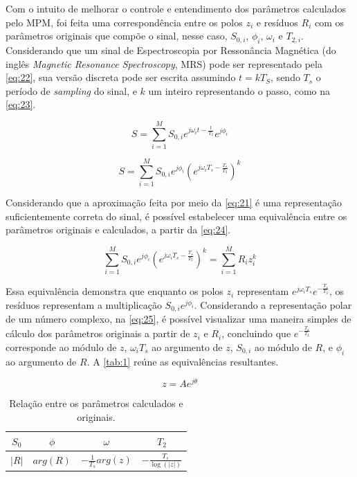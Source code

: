 \documentclass[12pt]{article}
\begin{document}
Com o intuito de melhorar o controle e entendimento dos parâmetros calculados pelo MPM, foi feita uma correspondência entre os polos $z_i$ e resíduos $R_i$ com
os parâmetros originais que compõe o sinal, nesse caso, $S_{0, i}$, $\phi_i$, $\omega_i$ e $T_{2, i}$. Considerando que um sinal de Espectroscopia por Ressonância Magnética 
(do inglês \textit{Magnetic Resonance Spectroscopy}, MRS) pode ser representado pela \autoref{eq:22}, sua versão discreta pode ser escrita assumindo $t = kT_S$, sendo $T_s$ 
o período de \textit{sampling} do sinal, e $k$ um inteiro representando o passo, como na \autoref{eq:23}.

\begin{equation} \label{eq:22}
    S = \sum_{i=1}^{M} S_{0, i} e^{j\omega_i t -\frac{t}{T_2}}e^{j \phi_i} 
\end{equation}

\begin{equation} \label{eq:23}
    S = \sum_{i=1}^{M} S_{0, i} e^{j \phi_i}  (e^{j\omega_i T_s -\frac{T_s}{T_2}})^k 
\end{equation}

Considerando que a aproximação feita por meio da \autoref{eq:21} é uma representação suficientemente correta do sinal, é possível estabelecer uma equivalência 
entre os parâmetros originais e calculados, a partir da \autoref{eq:24}.

\begin{equation} \label{eq:24}
    \sum_{i=1}^{M} S_{0, i} e^{j \phi_i}  (e^{j\omega_i T_s -\frac{T_s}{T_2}})^k  = \sum_{i = 1}^{M} R_i z_i^{k}
\end{equation}

Essa equivalência demonstra que enquanto os polos $z_i$ representam $e^{j\omega_i T_s} e^{-\frac{T_s}{T_2}}$, os resíduos representam a multiplicação 
$S_{0, i} e^{j \phi_i}$. Considerando a representação polar de um número complexo, na \autoref{eq:25}, é possível visualizar uma maneira simples de 
cálculo dos parâmetros originais a partir de $z_i$ e $R_i$, concluindo que $e^{-\frac{T_s}{T_2}}$ corresponde ao módulo de $z$, $\omega_i T_s$ ao argumento de $z$,
$S_{0, i}$ ao módulo de $R$, e $\phi_i$ ao argumento de $R$. A \autoref{tab:1} reúne as equivalências resultantes.

\begin{equation} \label{eq:25}
    z = A e^{j \theta}    
\end{equation}

\begin{table}[H]
    \centering
    \begin{tabular}{|c|c|c|c|}
        \hline
        $S_0$ & $\phi$ & $\omega$ & $T_2$ \\ 
        \hline
        $|R|$ & $arg(R)$ & $-\frac{1}{T_s} arg(z)$ & $-\frac{T_s}{\log(|z|)}$ \\
        \hline
    \end{tabular}
    \caption{Relação entre os parâmetros calculados e originais.}
    \label{tab:1}
\end{table}
\end{document}
